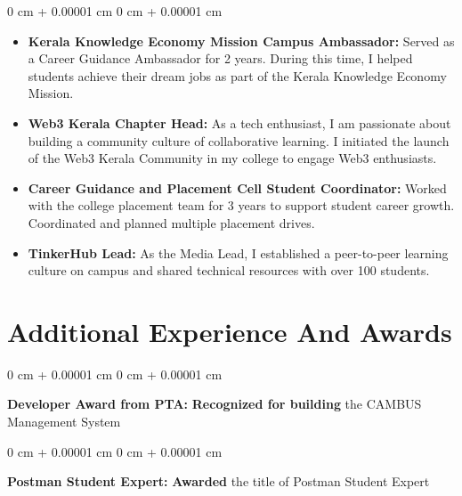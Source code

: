 \documentclass[10pt, letterpaper]{article}
\newenvironment{highlightsforbulletentries}{ \begin{itemize}[ topsep=0.10 cm,
parsep=0.10 cm, partopsep=0pt, itemsep=0pt, leftmargin=10pt ] }{ \end{itemize} } %
\newenvironment{onecolentry}{ \begin{adjustwidth}{ 0 cm + 0.00001 cm }{ 0 cm + 0.00001 cm }
}{ \end{adjustwidth} } %
\begin{document}
	\begin{onecolentry}
		\begin{highlightsforbulletentries}
			\item \textbf{Kerala Knowledge Economy Mission Campus Ambassador:} Served
			as a Career Guidance Ambassador for 2 years. During this time, I helped
			students achieve their dream jobs as part of the Kerala Knowledge Economy
			Mission.

			\item \textbf{Web3 Kerala Chapter Head:} As a tech enthusiast, I am
			passionate about building a community culture of collaborative learning. I
			initiated the launch of the Web3 Kerala Community in my college to engage Web3
			enthusiasts.

			\item \textbf{Career Guidance and Placement Cell Student Coordinator:}
			Worked with the college placement team for 3 years to support student
			career growth. Coordinated and planned multiple placement drives.

			\item \textbf{TinkerHub Lead:} As the Media Lead, I established a peer-to-peer
			learning culture on campus and shared technical resources with over 100 students.
		\end{highlightsforbulletentries}
	\end{onecolentry}

	\section{Additional Experience And Awards}

	\begin{onecolentry}
		\textbf{Developer Award from PTA:} \textbf{Recognized for building} the CAMBUS
		Management System
	\end{onecolentry}

	\vspace{0.2 cm}

	\begin{onecolentry}
		\textbf{Postman Student Expert:} \textbf{Awarded} the title of Postman Student
		Expert
	\end{onecolentry}
\end{document}

